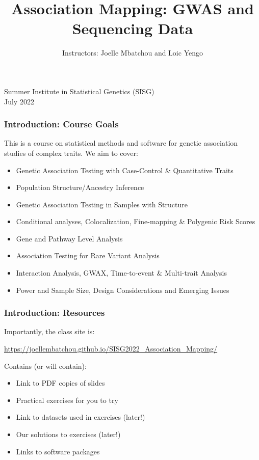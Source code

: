 \documentclass{beamer}
\title [Introduction to Association Mapping Module] {  \fontsize{12}{15}\selectfont Association Mapping: GWAS and Sequencing Data }
\author{Instructors: Joelle Mbatchou and Loic Yengo}
\date{}
\begin{document}
\begin{frame}
\titlepage
\vspace{-2cm}
\begin{center}
{ \large Summer Institute in Statistical Genetics (SISG) \\}
\vspace{.3cm}
 {\large July 2022 \\}
\vspace{.8cm}
\end{center}
\end{frame}



\begin{frame}
\frametitle{\bf Introduction: Course Goals}
This is a course on statistical methods and software for genetic association studies of complex traits. We aim to cover:
{\small
\begin{itemize}
\item Genetic Association Testing with Case-Control  \& Quantitative Traits
\item Population Structure/Ancestry Inference 
\item Genetic Association Testing in Samples with Structure
\item Conditional analyses, Colocalization, Fine-mapping \& Polygenic Risk Scores
\item Gene and Pathway Level Analysis 
\item Association Testing for Rare Variant Analysis
\item Interaction Analysis, GWAX, Time-to-event \& Multi-trait Analysis
\item Power and Sample Size, Design Considerations and Emerging Issues
\end{itemize}
}
\end{frame}


\begin{frame}[fragile]
\frametitle{\bf Introduction: Resources}

Importantly, the class site is: 
{\color{red}
 
\url{https://joellembatchou.github.io/SISG2022_Association_Mapping/}

}
\vspace{.3cm}
Contains (or will contain):
\begin{itemize}
\item Link to PDF copies of slides
\item Practical exercises for you to try
\item Link to datasets used in exercises (later!)
\item Our solutions to exercises (later!)
\item Links to software packages
\end{itemize}
\end{frame}
\end{document}
